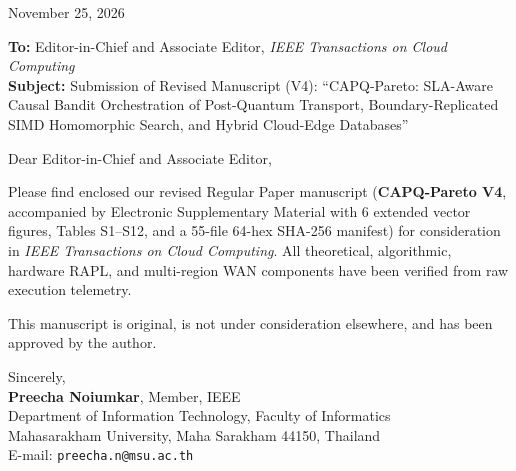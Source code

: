 \documentclass[11pt]{article}
\begin{document}
November 25, 2026

\textbf{To:} Editor-in-Chief and Associate Editor, \emph{IEEE Transactions on Cloud Computing}\\
\textbf{Subject:} Submission of Revised Manuscript (V4): ``CAPQ-Pareto: SLA-Aware Causal Bandit Orchestration of Post-Quantum Transport, Boundary-Replicated SIMD Homomorphic Search, and Hybrid Cloud-Edge Databases''

Dear Editor-in-Chief and Associate Editor,

Please find enclosed our revised Regular Paper manuscript (\textbf{CAPQ-Pareto V4}, accompanied by Electronic Supplementary Material with 6 extended vector figures, Tables S1--S12, and a 55-file 64-hex SHA-256 manifest) for consideration in \emph{IEEE Transactions on Cloud Computing}. All theoretical, algorithmic, hardware RAPL, and multi-region WAN components have been verified from raw execution telemetry.

This manuscript is original, is not under consideration elsewhere, and has been approved by the author.

Sincerely,\\[1.2em]
\textbf{Preecha Noiumkar}, Member, IEEE\\
Department of Information Technology, Faculty of Informatics\\
Mahasarakham University, Maha Sarakham 44150, Thailand\\
E-mail: \texttt{preecha.n@msu.ac.th}
\end{document}
